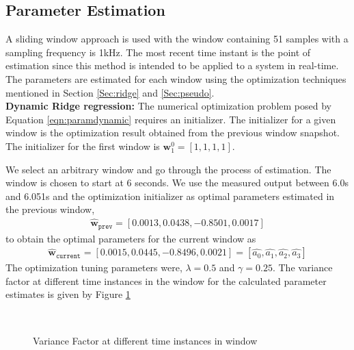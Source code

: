 \documentclass[letterpaper%
, twoside%
, 12pt%
,memoire%
, english%
,creativecommons,hyperref%
]{thETS}
\begin{document}
\subsection{Parameter Estimation}
A sliding window approach is used with the window containing 51 samples with a sampling frequency is 1kHz. The most recent time instant is the point of estimation since this method is intended to be applied to a system in real-time. The parameters are estimated for each window using the  optimization techniques mentioned in Section \ref{Sec:ridge} and  \ref{Sec:pseudo}. \\
\textbf{Dynamic Ridge regression:} The numerical optimization problem posed by Equation \eqref{eqn:paramdynamic} requires an initializer. The initializer for a given window is the optimization result obtained from the previous window snapshot. The initializer for the first window is $\textbf{w}_{1}^{0}=[1,1,1,1]$. 

We select an arbitrary window and go through the process of estimation. The window is chosen to start at 6 seconds. We use the measured output between 6.0s and 6.051s and the optimization initializer as optimal parameters estimated in the previous window, 
\begin{align*}
\hat{\textbf{w}}_{\texttt{prev}}=[0.0013, 0.0438, -0.8501, 0.0017]
\end{align*} to obtain the optimal parameters for the current window as 
\begin{align} \label{eqn:example2}
\hat{\textbf{w}}_{\texttt{current}}=[0.0015, 0.0445, -0.8496, 0.0021] = [\hat{a_0}, \hat{a_1}, \hat{a_2}, \hat{a_3}]
\end{align}
The optimization tuning parameters were, $\lambda=0.5$ and $\gamma=0.25$. The variance factor at different time instances in the window for the calculated parameter estimates is given by Figure \ref{Fig:varFacWin}
\begin{figure}[H]
	\centering
	 \\ \parbox{0.75\textwidth}{\caption{Variance Factor at different time instances in window\label{Fig:varFacWin}}}
\end{figure}
\end{document}
